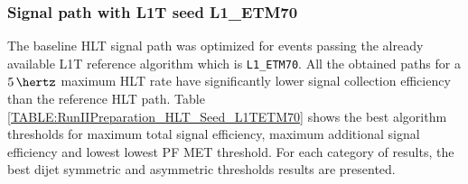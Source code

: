 \subsubsection{Signal path with L1T seed L1\_ETM70}
\label{SECTION:RunIITriggerStudies_HLTAlgorithmDevelopment_L1ETM70}


The baseline \gls{HLT} signal path was optimized for events passing the already available \gls{L1T} reference algorithm which is \verb|L1_ETM70|. All the obtained paths for a $5\,\hertz$ maximum \gls{HLT} rate have significantly lower signal collection efficiency than the reference \gls{HLT} path. Table \ref{TABLE:RunIIPreparation_HLT_Seed_L1TETM70} shows the best algorithm thresholds for maximum total signal efficiency, maximum additional signal efficiency and lowest lowest \gls{PF} \gls{MET} threshold. For each category of results, the best dijet symmetric and asymmetric \pt thresholds results are presented.


